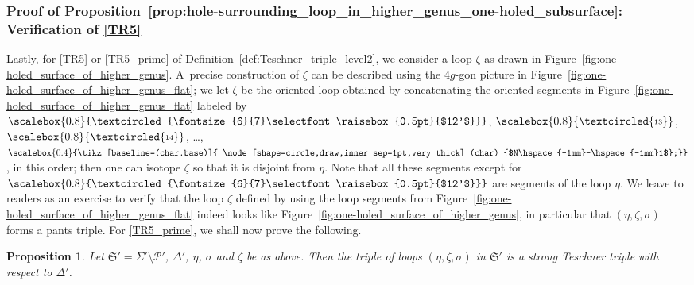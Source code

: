 \documentclass[pdftex]{sigma}
\numberwithin{equation}{section}
\newtheorem{Proposition}[Theorem]{Proposition}
\theoremstyle{definition}
\newcommand{\circledd}[1]{\scalebox{0.8}{\textcircled{\fontsize{6}{7}\selectfont \raisebox{0.5pt}{#1}}}}
\newcommand*\circleddd[1]{\scalebox{0.4}{\tikz[baseline=(char.base)]{
 \node[shape=circle,draw,inner sep=1pt,very thick] (char) {#1};}}}
\begin{document}
\subsubsection{Proof of Proposition~\ref{prop:hole-surrounding_loop_in_higher_genus_one-holed_subsurface}: Verification of \ref{TR5}}
\label{subsec:hole-surrounding_loop_in_one-holed_subsurface_deeper}
Lastly, for \ref{TR5} or \ref{TR5_prime} of Definition~\ref{def:Teschner_triple_level2}, we consider a loop $\zeta$ as drawn in Figure~\ref{fig:one-holed_surface_of_higher_genus}. A~precise construction of $\zeta$ can be described using the 4$g$-gon picture in Figure~\ref{fig:one-holed_surface_of_higher_genus_flat}; we let $\zeta$ be the oriented loop obtained by concatenating the oriented segments in Figure~\ref{fig:one-holed_surface_of_higher_genus_flat} labeled by $\circledd{$12'$}$, $\circledd{13}$, $\circledd{14}$, \dots, $\circleddd{$N\hspace{-1mm}-\hspace{-1mm}1$}$, in this order; then one can isotope $\zeta$ so that it is disjoint from $\eta$. Note that all these segments except for $\circledd{$12'$}$ are segments of the loop $\eta$. We leave to readers as an exercise to verify that the loop $\zeta$ defined by using the loop segments from Figure~\ref{fig:one-holed_surface_of_higher_genus_flat} indeed looks like Figure~\ref{fig:one-holed_surface_of_higher_genus}, in particular that $(\eta,\zeta,\sigma)$ forms a pants triple. For \ref{TR5_prime}, we shall now prove the following.
\begin{Proposition}
\label{prop:ohs_going_one_level_deeper}
Let $\mathfrak{S}' = \Sigma' \setminus \mathcal{P}'$, $\Delta'$, $\eta$, $\sigma$ and $\zeta$ be as above. Then the triple of loops $(\eta,\zeta,\sigma)$ in $\mathfrak{S}'$ is a strong Teschner triple with respect to $\Delta'$.
\end{Proposition}
\end{document}
